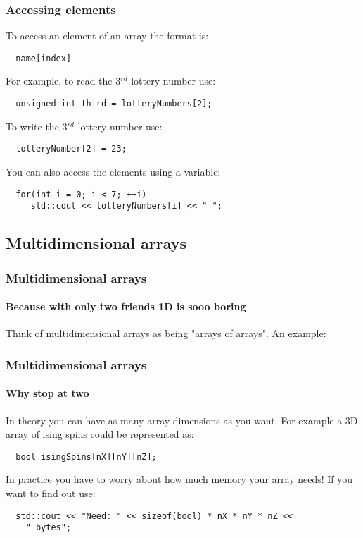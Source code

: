 \documentclass{beamer}
\begin{document}
\begin{frame}[fragile]
  \frametitle{Accessing elements}
  
  To access an element of an array the format is:
  \begin{lstlisting}
  name[index]
  \end{lstlisting}
  \pause
  For example, to read the 3$^{rd}$ lottery number use:
  \begin{lstlisting}
  unsigned int third = lotteryNumbers[2];
  \end{lstlisting}
  \pause
  To write the 3$^{rd}$ lottery number use:
  \begin{lstlisting}
  lotteryNumber[2] = 23;
  \end{lstlisting}
  \pause
  You can also access the elements using a variable:
  \begin{lstlisting}
  for(int i = 0; i < 7; ++i)
     std::cout << lotteryNumbers[i] << " ";
  \end{lstlisting}
\end{frame}

\subsection{Multidimensional arrays}

\begin{frame}[fragile]
  \frametitle{Multidimensional arrays}
  \framesubtitle{Because with only two friends 1D is sooo boring}
  Think of multidimensional arrays as being "arrays of arrays".  An example:
    
  

\end{frame}

\begin{frame}[fragile]
  \frametitle{Multidimensional arrays}
  \framesubtitle{Why stop at two}
  In theory you can have as many array dimensions as you want.  For example a 3D array of ising spins could be represented as:
  \begin{lstlisting}
  bool isingSpins[nX][nY][nZ];
  \end{lstlisting}
  In practice you have to worry about how much memory your array needs!\pause{}  If you want to find out use:
  \begin{lstlisting}
  std::cout << "Need: " << sizeof(bool) * nX * nY * nZ <<
    " bytes";
  \end{lstlisting}

\end{frame}
\end{document}
